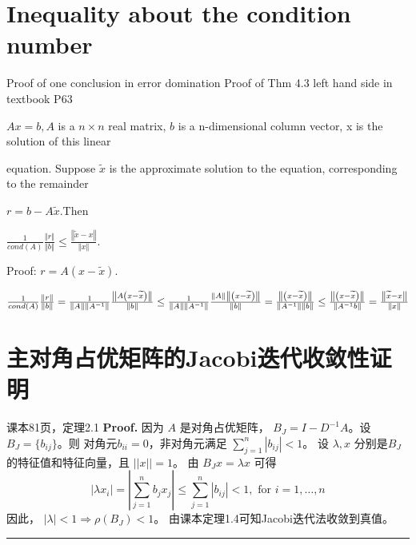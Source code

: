 \documentclass{article}
\newenvironment{proof}[1][Proof]{\noindent\textbf{#1.} }{\ \rule{0.5em}{0.5em}}
\begin{document}
\section{Inequality about the condition number}
Proof of one conclusion in error domination
Proof of Thm 4.3 left hand side in textbook P63

$Ax=b,A$ is a $n\times n$ real matrix, $b$ is a n-dimensional column vector,
x is the solution of this linear

equation. Suppose $\widetilde{x}$ is the approximate solution to the
equation, corresponding to the remainder 

$r=b-A\widetilde{x}.$Then 

$\frac{1}{cond(A)}\frac{\left\Vert r\right\Vert }{\left\Vert b\right\Vert }%
\leq \frac{\left\Vert \widetilde{x}-x\right\Vert }{\left\Vert x\right\Vert }.
$

Proof: $r=A\left( x-\widetilde{x}\right) .$

$\frac{1}{cond(A)}\frac{\left\Vert r\right\Vert }{\left\Vert b\right\Vert }=%
\frac{1}{\left\Vert A\right\Vert \left\Vert A^{-1}\right\Vert }\frac{%
\left\Vert A\left( x-\widetilde{x}\right) \right\Vert }{\left\Vert
b\right\Vert }\leq \frac{1}{\left\Vert A\right\Vert \left\Vert
A^{-1}\right\Vert }\frac{\left\Vert A\right\Vert \left\Vert \left( x-%
\widetilde{x}\right) \right\Vert }{\left\Vert b\right\Vert }=\frac{%
\left\Vert \left( x-\widetilde{x}\right) \right\Vert }{\left\Vert
A^{-1}\right\Vert \left\Vert b\right\Vert }\leq \frac{\left\Vert \left( x-%
\widetilde{x}\right) \right\Vert }{\left\Vert A^{-1}b\right\Vert }=\frac{%
\left\Vert \widetilde{x}-x\right\Vert }{\left\Vert x\right\Vert }$

\section{主对角占优矩阵的Jacobi迭代收敛性证明}
课本81页，定理2.1
\begin{proof}
因为 $A$ 是对角占优矩阵，
$B_J=I-D^{-1}A$。设$B_J=\{b_{ij}\}$。则
对角元$b_{ii}=0$，非对角元满足
$\sum_{j=1}^{n} |b_{ij}| < 1$。
设 $\lambda, x$ 分别是$B_J$的特征值和特征向量，且
$||x||=1$。
由 $B_J x = \lambda x$ 可得
\begin{equation*}
    |\lambda x_i| = |\sum_{j=1}^n b_j x_j| 
    \leq \sum_{j=1}^{n} |b_{ij}| < 1, \textrm{ for } i=1,\dots, n
\end{equation*}
因此， $|\lambda|<1 \Rightarrow \rho(B_J)<1$。
由课本定理1.4可知Jacobi迭代法收敛到真值。
\end{proof}
\end{document}
